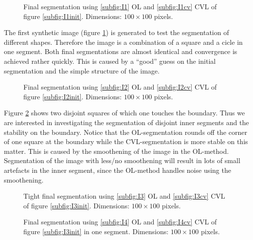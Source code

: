 \begin{figure}[h]
  \centering
  \caption{Final segmentation using \ref{subfig:I1} OL and \ref{subfig:I1cv} CVL of figure \ref{subfig:I1init}. Dimensions: $100\times 100$ pixels.}\label{I1}
\end{figure}

The first synthetic image (figure \ref{I1}) is generated to test the segmentation of different shapes. Therefore the image is a combination of a square and a cicle in one segment. Both final segmentations are almost identical and convergence is achieved rather quickly. This is caused by a ``good'' guess on the initial segmentation and the simple structure of the image.\\

\begin{figure}[h]
  \centering
  \caption{Final segmentation using \ref{subfig:I2} OL and \ref{subfig:I2cv} CVL of figure \ref{subfig:I2init}. Dimensions: $100\times 100$ pixels.}\label{I2}
\end{figure}

Figure \ref{I2} shows two disjoint squares of which one touches the boundary. Thus we are interested in investigating the segmentation of disjoint inner segments and the stability on the boundary. Notice that the OL-segmentation rounds off the corner of one square at the boundary while the CVL-segmentation is more stable on this matter. This is caused by the smoothening of the image in the OL-method. Segmentation of the image with less/no smoothening will result in lots of small artefacts in the inner segment, since the OL-method handles noise using the smoothening.\\

\begin{figure}[h]
  \centering
  \caption{Tight final segmentation using \ref{subfig:I3} OL and \ref{subfig:I3cv} CVL of figure \ref{subfig:I3init}. Dimensions: $100\times 100$ pixels.}\label{I3}
\end{figure}
\begin{figure}[h]
  \centering
  \caption{Final segmentation using \ref{subfig:I4} OL and \ref{subfig:I4cv} CVL of figure \ref{subfig:I3init} in one segment. Dimensions: $100\times 100$ pixels.}\label{I4}
\end{figure}


